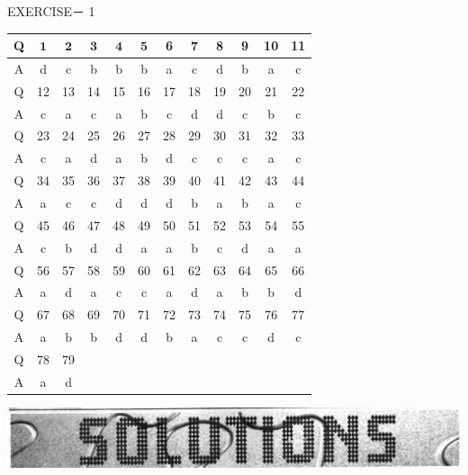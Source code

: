 \documentclass[10pt]{article}
\begin{document}
EXERCISE－ 1

\begin{center}
\begin{tabular}{|c|c|c|c|c|c|c|c|c|c|c|c|}
\hline
Q & $\mathbf{1}$ & $\mathbf{2}$ & $\mathbf{3}$ & $\mathbf{4}$ & $\mathbf{5}$ & 6 & 7 & 8 & 9 & 10 & 11 \\
\hline
A & d & c & b & b & b & a & c & d & b & a & c \\
\hline
Q & 12 & 13 & 14 & 15 & 16 & 17 & 18 & 19 & 20 & 21 & 22 \\
\hline
A & c & a & c & a & b & c & d & d & c & b & c \\
\hline
Q & 23 & 24 & 25 & 26 & 27 & 28 & 29 & 30 & 31 & 32 & 33 \\
\hline
A & c & a & d & a & b & d & c & c & c & a & c \\
\hline
Q & 34 & 35 & 36 & 37 & 38 & 39 & 40 & 41 & 42 & 43 & 44 \\
\hline
A & a & c & c & d & d & d & b & a & b & a & c \\
\hline
Q & 45 & 46 & 47 & 48 & 49 & 50 & 51 & 52 & 53 & 54 & 55 \\
\hline
A & c & b & d & d & a & a & b & c & d & a & a \\
\hline
Q & 56 & 57 & 58 & 59 & 60 & 61 & 62 & 63 & 64 & 65 & 66 \\
\hline
A & a & d & a & c & c & a & d & a & b & b & d \\
\hline
Q & 67 & 68 & 69 & 70 & 71 & 72 & 73 & 74 & 75 & 76 & 77 \\
\hline
A & a & b & b & d & d & b & a & c & c & d & c \\
\hline
Q & 78 & 79 &  &  &  &  &  &  &  &  &  \\
\hline
A & a & d &  &  &  &  &  &  &  &  &  \\
\hline
\end{tabular}
\end{center}

\begin{center}
\includegraphics[max width=\textwidth]{2025_01_28_8470952b98110cec3aabg-241(3)}
\end{center}
\end{document}
